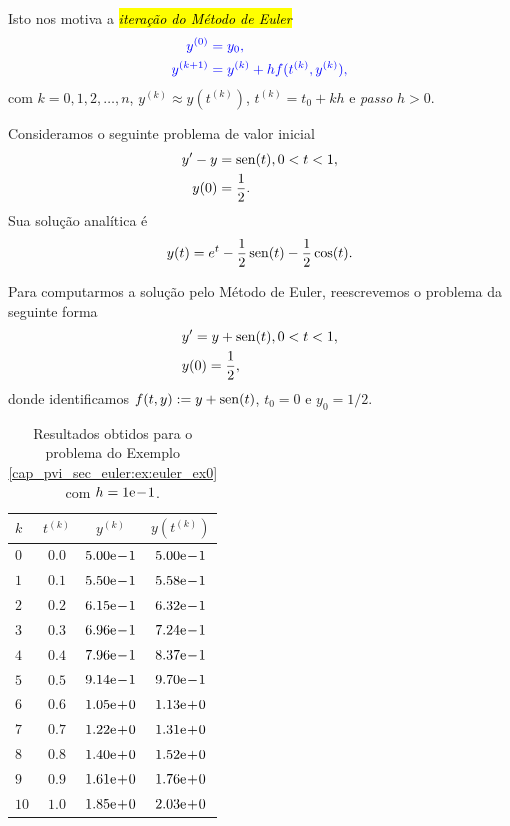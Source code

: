 Isto nos motiva a \hl{\emph{iteração do Método de Euler}}{\euler}
\begin{subequations}\hleq
  \begin{align}
    y^{(0)} &= y_0,\\
    y^{(k+1)} &= y^{(k)} + hf(t^{(k)},y^{(k)}),
  \end{align}
\end{subequations}
com $k=0, 1, 2, \dotsc, n$, $y^{(k)}\approx y\left(t^{(k)}\right)$, $t^{(k)} = t_0 + kh$ e \emph{passo} $h>0$.

\begin{ex}\label{cap_pvi_sec_euler:ex:euler_ex0}
  Consideramos o seguinte problema de valor inicial
  \begin{subequations}
    \begin{align}
      y' - y &= \operatorname{sen}(t), 0 < t < 1,\\
      y(0) &= \frac{1}{2}.
    \end{align}
  \end{subequations}
  Sua solução analítica é
  \begin{equation}
    y(t) = e^t - \frac{1}{2}\operatorname{sen}(t) - \frac{1}{2}\cos(t).
  \end{equation}

  Para computarmos a solução pelo Método de Euler, reescrevemos o problema da seguinte forma
  \begin{subequations}
    \begin{align}
      &y' = y + \operatorname{sen}(t), 0 < t < 1,\\
      &y(0) = \frac{1}{2},
    \end{align}
  \end{subequations}
  donde identificamos $f(t,y) := y + \operatorname{sen}(t)$, $t_0=0$ e $y_0=1/2$.

  \begin{table}[H]
    \centering
    \caption{Resultados obtidos para o problema do Exemplo \ref{cap_pvi_sec_euler:ex:euler_ex0} com $h=1\mathrm{e}\!-\!1$.}
    \begin{tabular}{l|cc|c}
      $k$ & $t^{(k)}$ &  $y^{(k)}$ & $y\left(t^{(k)}\right)$ \\\hline
      $0$ & $0.0$ & $5.00\mathrm{e}\!-\!1$ & $5.00\mathrm{e}\!-\!1$\\
      $1$ & $0.1$ & $5.50\mathrm{e}\!-\!1$ & $5.58\mathrm{e}\!-\!1$\\
      $2$ & $0.2$ & $6.15\mathrm{e}\!-\!1$ & $6.32\mathrm{e}\!-\!1$\\
      $3$ & $0.3$ & $6.96\mathrm{e}\!-\!1$ & $7.24\mathrm{e}\!-\!1$\\
      $4$ & $0.4$ & $7.96\mathrm{e}\!-\!1$ & $8.37\mathrm{e}\!-\!1$\\
      $5$ & $0.5$ & $9.14\mathrm{e}\!-\!1$ & $9.70\mathrm{e}\!-\!1$\\
      $6$ & $0.6$ & $1.05\mathrm{e}\!+\!0$ & $1.13\mathrm{e}\!+\!0$\\
      $7$ & $0.7$ & $1.22\mathrm{e}\!+\!0$ & $1.31\mathrm{e}\!+\!0$\\
      $8$ & $0.8$ & $1.40\mathrm{e}\!+\!0$ & $1.52\mathrm{e}\!+\!0$\\
      $9$ & $0.9$ & $1.61\mathrm{e}\!+\!0$ & $1.76\mathrm{e}\!+\!0$\\
      $10$ & $1.0$ & $1.85\mathrm{e}\!+\!0$ & $2.03\mathrm{e}\!+\!0$\\\hline
    \end{tabular}
  \end{table}


\end{ex}
